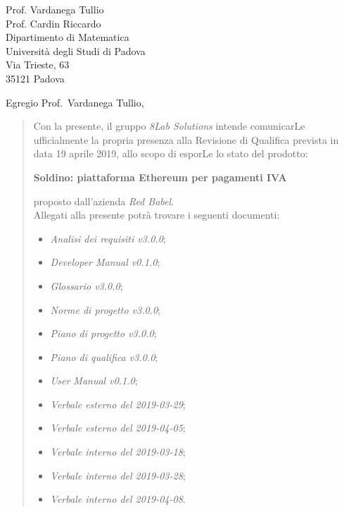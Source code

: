 
\begin{letter}{
		Prof. Vardanega Tullio \\
		Prof. Cardin Riccardo \\
		Dipartimento di Matematica \\
		Università degli Studi di Padova \\
		Via Trieste, 63 \\
		35121 Padova}
		
\opening{Egregio Prof.~Vardanega Tullio,}

\begin{quotation}
Con la presente, il gruppo \textit{8Lab Solutions} intende 
comunicarLe ufficialmente la propria presenza alla Revisione di 
Qualifica prevista in data 19 aprile 2019, allo scopo di 
esporLe lo stato del prodotto:

\begin{center}
	\textbf{Soldino: piattaforma Ethereum per pagamenti IVA}
\end{center}

\noindent proposto dall'azienda \textit{Red Babel}. \\
Allegati alla presente potrà trovare i seguenti documenti:

\begin{itemize}
	\item \textit{Analisi dei requisiti v3.0.0};
	
	\item \textit{Developer Manual v0.1.0};
	
	\item \textit{Glossario v3.0.0};
	
	\item \textit{Norme di progetto v3.0.0};

	\item \textit{Piano di progetto v3.0.0};

	\item \textit{Piano di qualifica v3.0.0};
	
	\item \textit{User Manual v0.1.0};
	
	
	\item \textit{Verbale esterno del 2019-03-29};
	\item \textit{Verbale esterno del 2019-04-05};
	\item \textit{Verbale interno del 2019-03-18};
	\item \textit{Verbale interno del 2019-03-28};
	\item \textit{Verbale interno del 2019-04-08}.
\end{itemize}
	



\end{quotation}
\end{letter}
